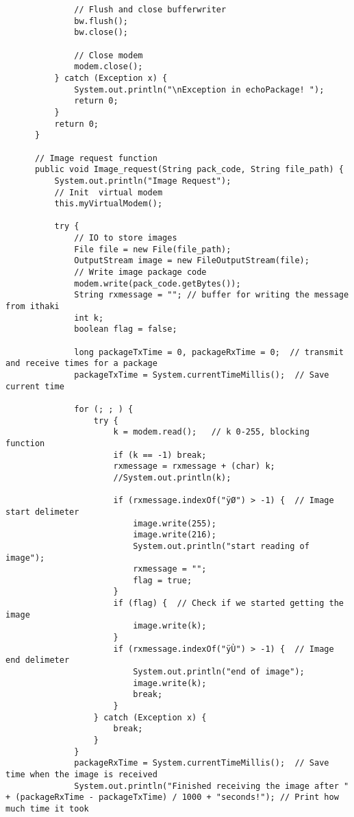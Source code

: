 \documentclass[10pt,a4paper]{article}
\begin{document}
\begin{lstlisting}
              // Flush and close bufferwriter
              bw.flush();
              bw.close();
  
              // Close modem
              modem.close();
          } catch (Exception x) {
              System.out.println("\nException in echoPackage! ");
              return 0;
          }
          return 0;
      }
  
      // Image request function
      public void Image_request(String pack_code, String file_path) {
          System.out.println("Image Request");
          // Init  virtual modem
          this.myVirtualModem();
  
          try {
              // IO to store images
              File file = new File(file_path);
              OutputStream image = new FileOutputStream(file);
              // Write image package code
              modem.write(pack_code.getBytes());
              String rxmessage = ""; // buffer for writing the message from ithaki
              int k;
              boolean flag = false;
  
              long packageTxTime = 0, packageRxTime = 0;  // transmit and receive times for a package
              packageTxTime = System.currentTimeMillis();  // Save current time
  
              for (; ; ) {
                  try {
                      k = modem.read();   // k 0-255, blocking function
                      if (k == -1) break;
                      rxmessage = rxmessage + (char) k;
                      //System.out.println(k);
  
                      if (rxmessage.indexOf("ÿØ") > -1) {  // Image start delimeter
                          image.write(255);
                          image.write(216);
                          System.out.println("start reading of image");
                          rxmessage = "";
                          flag = true;
                      }
                      if (flag) {  // Check if we started getting the image
                          image.write(k);
                      }
                      if (rxmessage.indexOf("ÿÙ") > -1) {  // Image end delimeter
                          System.out.println("end of image");
                          image.write(k);
                          break;
                      }
                  } catch (Exception x) {
                      break;
                  }
              }
              packageRxTime = System.currentTimeMillis();  // Save time when the image is received
              System.out.println("Finished receiving the image after " + (packageRxTime - packageTxTime) / 1000 + "seconds!"); // Print how much time it took
  

\end{lstlisting}
\end{document}
